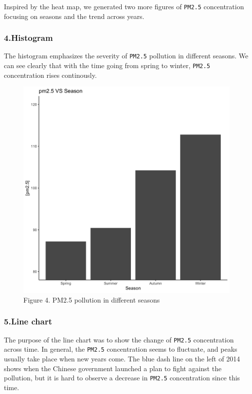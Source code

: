 \documentclass[
]{article}
\begin{document}
Inspired by the heat map, we generated two more figures of
\texttt{PM2.5} concentration focusing on seasons and the trend across
years.

\hypertarget{histogram}{%
\subsubsection{4.Histogram}\label{histogram}}

The histogram emphasizes the severity of \texttt{PM2.5} pollution in
different seasons. We can see clearly that with the time going from
spring to winter, \texttt{PM2.5} concentration rises continously.

\begin{figure}
\centering
\includegraphics{../images/season_PM2.5.png}
\caption{Figure 4. PM2.5 pollution in different seasons}
\end{figure}

\hypertarget{line-chart}{%
\subsubsection{5.Line chart}\label{line-chart}}

The purpose of the line chart was to show the change of \texttt{PM2.5}
concentration across time. In general, the \texttt{PM2.5} concentration
seems to fluctuate, and peaks usually take place when new years come.
The blue dash line on the left of 2014 shows when the Chinese government
launched a plan to fight against the pollution, but it is hard to
observe a decrease in \texttt{PM2.5} concentration since this time.
\end{document}
